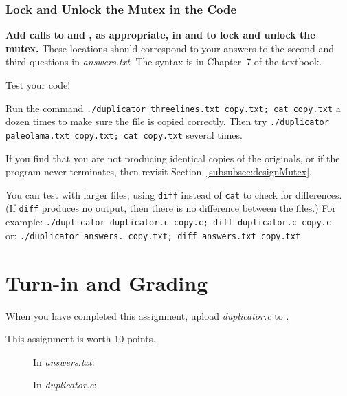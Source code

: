     \subsubsection{Lock and Unlock the Mutex in the Code}

    \textbf{Add calls to  and , as appropriate, in  and  to lock and unlock the mutex.}
    These locations should correspond to your answers to the second and third questions in \textit{answers.txt}.
    The syntax is in Chapter~7 of the textbook.

    Test your code!

    Run the command \texttt{./duplicator threelines.txt copy.txt; cat copy.txt} a dozen times to make sure the file is copied correctly.
    Then try \texttt{./duplicator paleolama.txt copy.txt; cat copy.txt} several times.

    If you find that you are not producing identical copies of the originals, or if the program never terminates, then revisit Section~\ref{subsubsec:designMutex}.

    You can test with larger files, using \texttt{diff} instead of \texttt{cat} to check for differences.
    (If \texttt{diff} produces no output, then there is no difference between the files.)
    For example: \texttt{./duplicator duplicator.c copy.c; diff duplicator.c copy.c} \\
    or: \texttt{./duplicator answers. copy.txt; diff answers.txt copy.txt}


    \section{Turn-in and Grading}

    When you have completed this assignment, upload \textit{duplicator.c} to
    \filesubmission.

    This assignment is worth 10 points. \\

    \begin{description}
        \item[] In \textit{answers.txt}:
        \item[] In \textit{duplicator.c}:
    \end{description}

